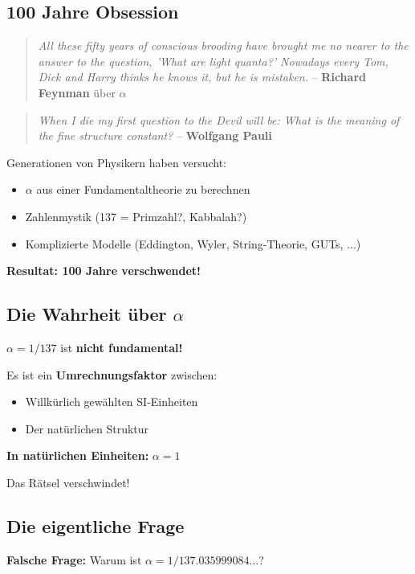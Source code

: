 \subsection{100 Jahre Obsession}

\begin{quote}
	\textit{All these fifty years of conscious brooding have brought me no nearer to the answer to the question, 'What are light quanta?' Nowadays every Tom, Dick and Harry thinks he knows it, but he is mistaken.} -- \textbf{Richard Feynman} über $\alpha$
\end{quote}

\begin{quote}
	\textit{When I die my first question to the Devil will be: What is the meaning of the fine structure constant?} -- \textbf{Wolfgang Pauli}
\end{quote}

Generationen von Physikern haben versucht:
\begin{itemize}[nosep]
	\item $\alpha$ aus einer Fundamentaltheorie zu berechnen
	\item Zahlenmystik (137 = Primzahl?, Kabbalah?)
	\item Komplizierte Modelle (Eddington, Wyler, String-Theorie, GUTs, ...)
\end{itemize}

\textbf{Resultat: 100 Jahre verschwendet!}

\subsection{Die Wahrheit über $\alpha$}

$\alpha = 1/137$ ist \textbf{nicht fundamental!}

Es ist ein \textbf{Umrechnungsfaktor} zwischen:
\begin{itemize}[nosep]
	\item Willkürlich gewählten SI-Einheiten
	\item Der natürlichen Struktur
\end{itemize}

\textbf{In natürlichen Einheiten:} $\alpha = 1$

Das Rätsel verschwindet!

\subsection{Die eigentliche Frage}

\textbf{Falsche Frage:} Warum ist $\alpha = 1/137.035999084...$?

